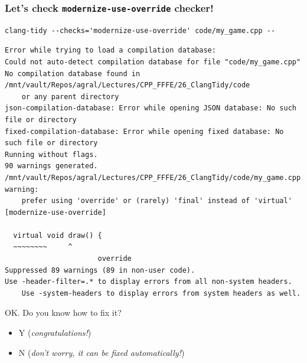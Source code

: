 \documentclass[aspectratio=169]{beamer}
\begin{document}
\begin{frame}[fragile]
  \frametitle{Let's check \texttt{modernize-use-override} checker!}
    {\fontsize{8}{6} \begin{lstlisting}[showstringspaces=false]
clang-tidy --checks='modernize-use-override' code/my_game.cpp --
    \end{lstlisting}}
    {\fontsize{6}{6} \begin{lstlisting}[showstringspaces=false]
Error while trying to load a compilation database:
Could not auto-detect compilation database for file "code/my_game.cpp"
No compilation database found in /mnt/vault/Repos/agral/Lectures/CPP_FFFE/26_ClangTidy/code
    or any parent directory
json-compilation-database: Error while opening JSON database: No such file or directory
fixed-compilation-database: Error while opening fixed database: No such file or directory
Running without flags.
90 warnings generated.
/mnt/vault/Repos/agral/Lectures/CPP_FFFE/26_ClangTidy/code/my_game.cpp:13:16: warning:
    prefer using 'override' or (rarely) 'final' instead of 'virtual' [modernize-use-override]

  virtual void draw() {
  ~~~~~~~~     ^
                      override
Suppressed 89 warnings (89 in non-user code).
Use -header-filter=.* to display errors from all non-system headers.
    Use -system-headers to display errors from system headers as well.
    \end{lstlisting}}
  \pause{}
  \vspace*{18pt}
  \begin{center}{\Large OK. Do \textcolor{clTwelveBitGreen}{you} know how to fix it?}\end{center}
    \begin{itemize}
      \item{}Y (\textit{congratulations!})
      \item{}N (\textit{don't worry, it can be \textcolor{clTwelveBitOrange}{fixed automatically}!})
    \end{itemize}
\end{frame}
\end{document}
